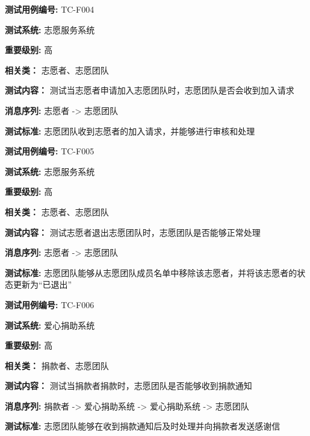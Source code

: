 \begin{framed}
\textbf{测试用例编号:} TC-F004

\textbf{测试系统:} 志愿服务系统

\textbf{重要级别:} 高

\textbf{相关类：} 志愿者、志愿团队

\textbf{测试内容：} 测试当志愿者申请加入志愿团队时，志愿团队是否会收到加入请求

\textbf{消息序列:} 志愿者 -> 志愿团队

\textbf{测试标准:} 志愿团队收到志愿者的加入请求，并能够进行审核和处理

\begin{center}
\end{center}
\end{framed}

\begin{framed}
\textbf{测试用例编号:} TC-F005

\textbf{测试系统:} 志愿服务系统

\textbf{重要级别:} 高

\textbf{相关类：} 志愿者、志愿团队

\textbf{测试内容：} 测试志愿者退出志愿团队时，志愿团队是否能够正常处理

\textbf{消息序列:} 志愿者 -> 志愿团队

\textbf{测试标准:} 志愿团队能够从志愿团队成员名单中移除该志愿者，并将该志愿者的状态更新为“已退出”

\begin{center}
\end{center}
\end{framed}

\begin{framed} \textbf{测试用例编号:} TC-F006

\textbf{测试系统:} 爱心捐助系统

\textbf{重要级别:} 高

\textbf{相关类：} 捐款者、志愿团队

\textbf{测试内容：} 测试当捐款者捐款时，志愿团队是否能够收到捐款通知

\textbf{消息序列:} 捐款者 -> 爱心捐助系统 -> 爱心捐助系统 -> 志愿团队

\textbf{测试标准:} 志愿团队能够在收到捐款通知后及时处理并向捐款者发送感谢信

\begin{center}  \end{center} \end{framed}

